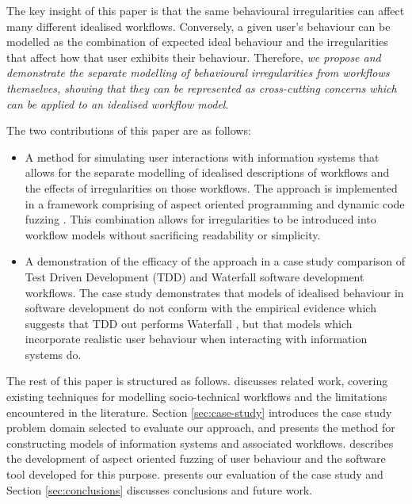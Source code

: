 \documentclass{llncs}
\begin{document}
The key insight of this paper is that the same behavioural irregularities can affect many different idealised
workflows.  Conversely, a given user's behaviour can be modelled as the combination of expected ideal behaviour and the
irregularities that affect how that user exhibits their behaviour.  Therefore, \emph{we propose and demonstrate the
  separate modelling of behavioural irregularities from workflows themselves, showing that they can be represented as
  cross-cutting concerns which can be applied to an idealised workflow model}.

The two contributions of this paper are as follows:

\begin{itemize}

\item A method for simulating user interactions with information systems that allows for the separate modelling of
  idealised descriptions of workflows and the effects of irregularities on those
  workflows.  The approach is implemented in a framework comprising of aspect oriented
  programming \cite{filman01aspect} and dynamic code fuzzing
  \citep{takanen08fuzzing}.  This combination allows for irregularities to be introduced into workflow models
  without sacrificing readability
  or simplicity.

\item A demonstration of the efficacy of the approach in a case study comparison of Test Driven Development (TDD) and
  Waterfall software development workflows.  The case study demonstrates that models of idealised behaviour in software
  development do not conform with the empirical evidence which suggests that TDD out performs Waterfall
  \citep{Bhat2006TestDrivenDevelopment,George2004TestDrivenDevelopment,Huang2009EmpiricalTestFirstProgramming}, but that
  models which incorporate realistic user behaviour when interacting with information systems do.

\end{itemize}

The rest of this paper is structured as follows.   discusses related work, covering existing
techniques for modelling socio-technical workflows and the limitations encountered in the literature.  Section
\ref{sec:case-study} introduces the case study problem domain selected to evaluate our approach, and presents the method
for constructing models of information systems and associated workflows.  describes the development of
aspect oriented fuzzing of user behaviour and the software tool developed for this purpose.  
presents our evaluation of the case study and Section \ref{sec:conclusions} discusses conclusions and future work.
\end{document}
